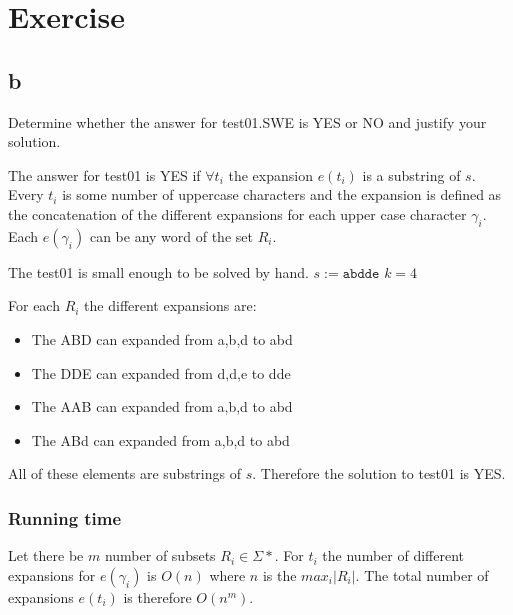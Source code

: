 \documentclass{article}
\begin{document}
\section{Exercise}
\subsection{b}


Determine whether the answer for test01.SWE is YES or NO and justify your solution. 

The answer for test01 is YES if $\forall t_i$ the expansion $e(t_i)$ is a substring of $s$. Every $t_i$ is some number of uppercase characters and the expansion is defined as the concatenation of the different expansions for each upper case character $\gamma_i$. Each $e(\gamma_i)$ can be any word of the set $R_i$. 

The test01 is small enough to be solved by hand. $s := \texttt{abdde}$ $k=4$

For each $R_i$ the different expansions are:
\begin{itemize}
    \item The ABD can expanded from a,b,d to abd
    \item The DDE can expanded from d,d,e to dde
    \item The AAB can expanded from a,b,d to abd
    \item The ABd can expanded from a,b,d to abd
\end{itemize}

All of these elements are substrings of $s$. Therefore the solution to test01 is YES.

\subsubsection{Running time}
Let there be $m$ number of subsets $R_i \in \Sigma*$. For $t_i$ the number of different expansions for $e(\gamma_i)$ is $O(n)$ where $n$ is the $max_i |R_i|$. The total number of expansions $e(t_i)$ is therefore $O(n^m)$.
\end{document}

